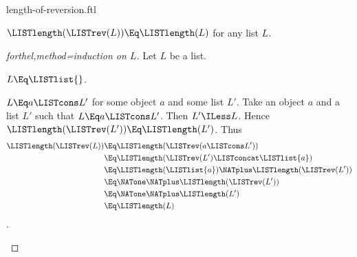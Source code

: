 \documentclass{stex}
\begin{document}
\begin{smodule}{length-of-reversion.ftl}

\begin{proposition}[forthel]
  $\LISTlength(\LISTrev(L)) \Eq \LISTlength(L)$ for any list $L$.
\end{proposition}
\begin{proof}[forthel,method=induction on $L$]
  Let $L$ be a list.
  
  \begin{case}{$L \Eq \LISTlist{}$.}\end{case}
  
  \begin{case}{$L \Eq a \LISTcons L'$ for some object $a$ and some list $L'$.}
    Take an object $a$ and a list $L'$ such that $L \Eq a \LISTcons L'$.
    Then $L' \ILess L$.
    Hence $\LISTlength(\LISTrev(L')) \Eq \LISTlength(L')$.
    Thus
    \begin{align*}
      \LISTlength(\LISTrev(L))
        &\Eq \LISTlength(\LISTrev(a \LISTcons L'))\\
        &\Eq \LISTlength(\LISTrev(L') \LISTconcat \LISTlist{a})\\
        &\Eq \LISTlength(\LISTlist{a}) \NATplus \LISTlength(\LISTrev(L'))\\
        &\Eq \NATone \NATplus \LISTlength(\LISTrev(L'))\\
        &\Eq \NATone \NATplus \LISTlength(L')\\
        &\Eq \LISTlength(L)
    \end{align*}.
  \end{case}
\end{proof}
\end{smodule}
\end{document}
